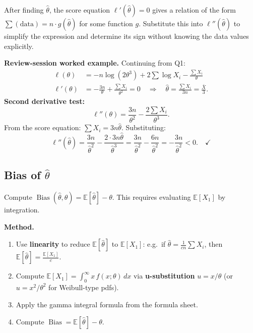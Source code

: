 \documentclass[11pt,a4paper]{article}
\newcommand{\E}{\mathbb{E}}
\newcommand{\Bias}{\operatorname{Bias}}
\begin{document}
\begin{tcolorbox}[infobox, title={The substitution trick for the second derivative test}]
After finding $\hat\theta$, the score equation $\ell'(\hat\theta)=0$ gives a relation of the form
$\sum(\text{data}) = n \cdot g(\hat\theta)$ for some function $g$. Substitute this into $\ell''(\hat\theta)$ to simplify the expression and determine its sign without knowing the data values explicitly.
\end{tcolorbox}

\textbf{Review-session worked example.} Continuing from Q1:
\begin{align*}
  \ell(\theta) &= -n\log(2\theta^3) + 2\sum\log X_i - \frac{\sum X_i}{\theta}\\
  \ell'(\theta) &= -\frac{3n}{\theta} + \frac{\sum X_i}{\theta^2} = 0
  \quad\Longrightarrow\quad \hat\theta = \frac{\sum X_i}{3n} = \frac{\bar X}{3}.
\end{align*}
\textbf{Second derivative test:}
\[
  \ell''(\theta) = \frac{3n}{\theta^2} - \frac{2\sum X_i}{\theta^3}.
\]
From the score equation: $\sum X_i = 3n\hat\theta$. Substituting:
\[
  \ell''(\hat\theta) = \frac{3n}{\hat\theta^2} - \frac{2 \cdot 3n\hat\theta}{\hat\theta^3}
  = \frac{3n}{\hat\theta^2} - \frac{6n}{\hat\theta^2} = -\frac{3n}{\hat\theta^2} < 0. \quad \checkmark
\]

\subsection{Bias of $\hat\theta$}

\begin{tcolorbox}[questionbox, title={Question 3}]
Compute $\Bias(\hat\theta,\theta) = \E[\hat\theta] - \theta$. This requires evaluating $\E[X_1]$ by integration.
\end{tcolorbox}

\textbf{Method.}
\begin{enumerate}[leftmargin=2em]
  \item Use \textbf{linearity} to reduce $\E[\hat\theta]$ to $\E[X_1]$: e.g.\ if $\hat\theta = \frac{1}{cn}\sum X_i$, then $\E[\hat\theta] = \frac{\E[X_1]}{c}$.
  \item Compute $\E[X_1] = \int_0^\infty x\,f(x;\theta)\,dx$ via \textbf{u-substitution} $u = x/\theta$ (or $u=x^2/\theta^2$ for Weibull-type pdfs).
  \item Apply the gamma integral formula from the formula sheet.
  \item Compute $\Bias = \E[\hat\theta] - \theta$.
\end{enumerate}
\end{document}
